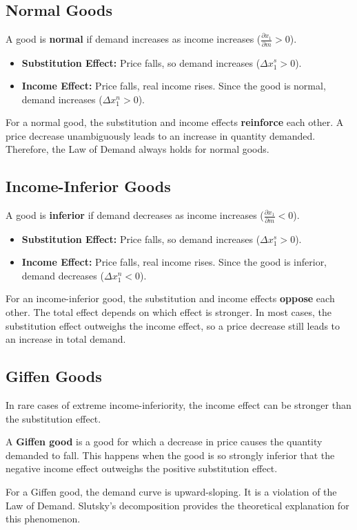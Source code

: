 \subsection{Normal Goods}
A good is \textbf{normal} if demand increases as income increases (\(\frac{\partial x_1}{\partial m} > 0\)).
\begin{itemize}
    \item \textbf{Substitution Effect:} Price falls, so demand increases (\(\Delta x_1^s > 0\)).
    \item \textbf{Income Effect:} Price falls, real income rises. Since the good is normal, demand increases (\(\Delta x_1^n > 0\)).
\end{itemize}
For a normal good, the substitution and income effects \textbf{reinforce} each other. A price decrease unambiguously leads to an increase in quantity demanded. Therefore, the Law of Demand always holds for normal goods.

\subsection{Income-Inferior Goods}
A good is \textbf{inferior} if demand decreases as income increases (\(\frac{\partial x_1}{\partial m} < 0\)).
\begin{itemize}
    \item \textbf{Substitution Effect:} Price falls, so demand increases (\(\Delta x_1^s > 0\)).
    \item \textbf{Income Effect:} Price falls, real income rises. Since the good is inferior, demand decreases (\(\Delta x_1^n < 0\)).
\end{itemize}
For an income-inferior good, the substitution and income effects \textbf{oppose} each other. The total effect depends on which effect is stronger. In most cases, the substitution effect outweighs the income effect, so a price decrease still leads to an increase in total demand.

\subsection{Giffen Goods}
In rare cases of extreme income-inferiority, the income effect can be stronger than the substitution effect.
\begin{definition}
A \textbf{Giffen good} is a good for which a decrease in price causes the quantity demanded to fall. This happens when the good is so strongly inferior that the negative income effect outweighs the positive substitution effect.
\end{definition}
For a Giffen good, the demand curve is upward-sloping. It is a violation of the Law of Demand. Slutsky's decomposition provides the theoretical explanation for this phenomenon.

